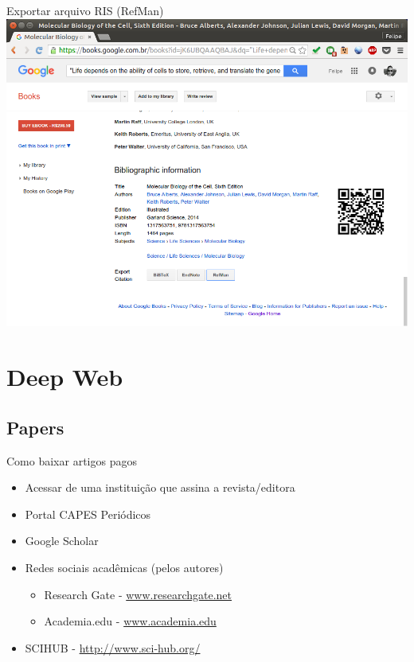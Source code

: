 \documentclass{beamer}
\begin{document}
\begin{frame}{Exportar arquivo RIS (RefMan)}
  \includegraphics[height=.85\textheight]{Busca/gbooks-about2}
\end{frame}

\section{Deep Web}

\subsection{Papers}

\begin{frame}{Como baixar artigos pagos}
  \begin{itemize}
  \item Acessar de uma instituição que assina a revista/editora
  \item Portal CAPES Periódicos
  \item Google Scholar
  \item Redes sociais acadêmicas (pelos autores)
    \begin{itemize}
    \item Research Gate - \url{www.researchgate.net}
    \item Academia.edu - \url{www.academia.edu}
    \end{itemize}
  \item SCIHUB - \url{http://www.sci-hub.org/}
  \end{itemize}
\end{frame}
\end{document}
